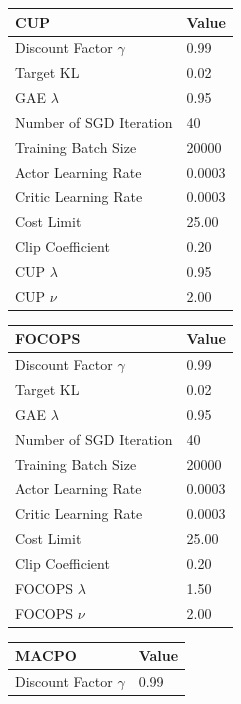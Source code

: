 \documentclass{article}
\begin{document}
\begin{table}[ht]
{\begin{subtable}{.5\textwidth}
  \centering
  \begin{tabular}{ll}
    \toprule
    \textbf{CUP} & \textbf{Value} \\
    \midrule
    Discount Factor $\gamma$ & 0.99 \\
    Target KL & 0.02 \\
    GAE $\lambda$ & 0.95 \\
    Number of SGD Iteration & 40 \\
    Training Batch Size & 20000 \\
    Actor Learning Rate & 0.0003 \\
    Critic Learning Rate & 0.0003 \\
    Cost Limit & 25.00 \\
    Clip Coefficient & 0.20 \\
    CUP $\lambda$ & 0.95 \\
    CUP $\nu$ & 2.00 \\
    \bottomrule
  \end{tabular}
\end{subtable}\hfill 
\begin{subtable}{.5\textwidth}
  \centering
  \begin{tabular}{ll}
    \toprule
    \textbf{FOCOPS} & \textbf{Value} \\
    \midrule
    Discount Factor $\gamma$ & 0.99 \\
    Target KL & 0.02 \\
    GAE $\lambda$ & 0.95 \\
    Number of SGD Iteration & 40 \\
    Training Batch Size & 20000 \\
    Actor Learning Rate & 0.0003 \\
    Critic Learning Rate & 0.0003 \\
    Cost Limit & 25.00 \\
    Clip Coefficient & 0.20 \\
    FOCOPS $\lambda$ & 1.50 \\
    FOCOPS $\nu$ & 2.00 \\
    \bottomrule
  \end{tabular}
\end{subtable}
\begin{subtable}{.5\textwidth}
  \centering
  \begin{tabular}{ll}
    \toprule
    \textbf{MACPO} & \textbf{Value} \\
    \midrule
    Discount Factor $\gamma$ & 0.99 \\

\end{tabular}
\end{subtable}}
\end{table}
\end{document}
